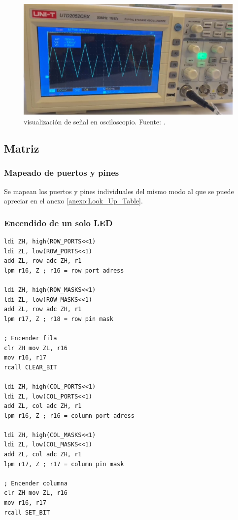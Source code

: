 \begin{figure}[H]
  \centering
  \includegraphics[width=\linewidth]{./Anexos/Resultados/DAC/Ocsiloscopio.jpg}
  \caption{visualización de señal en osciloscopio. Fuente: \cite{LabDrive}.}
  \label{fig:conversor_osciloscopio}
\end{figure}

\subsection{Matriz}

\subsubsection{Mapeado de puertos y pines}
Se mapean los puertos y pines individuales del mismo modo al que se puede apreciar en el anexo \ref{anexo:Look_Up_Table}.

\subsubsection{Encendido de un solo LED}
\begin{verbatim}
ldi ZH, high(ROW_PORTS<<1) 
ldi ZL, low(ROW_PORTS<<1)
add ZL, row adc ZH, r1  
lpm r16, Z ; r16 = row port adress
        
ldi ZH, high(ROW_MASKS<<1) 
ldi ZL, low(ROW_MASKS<<1)
add ZL, row adc ZH, r1
lpm r17, Z ; r18 = row pin mask

; Encender fila
clr ZH mov ZL, r16 
mov r16, r17
rcall CLEAR_BIT

ldi ZH, high(COL_PORTS<<1) 
ldi ZL, low(COL_PORTS<<1)  
add ZL, col adc ZH, r1  
lpm r16, Z ; r16 = column port adress

ldi ZH, high(COL_MASKS<<1) 
ldi ZL, low(COL_MASKS<<1)  
add ZL, col adc ZH, r1  
lpm r17, Z ; r17 = column pin mask

; Encender columna
clr ZH mov ZL, r16 
mov r16, r17
rcall SET_BIT
\end{verbatim}

